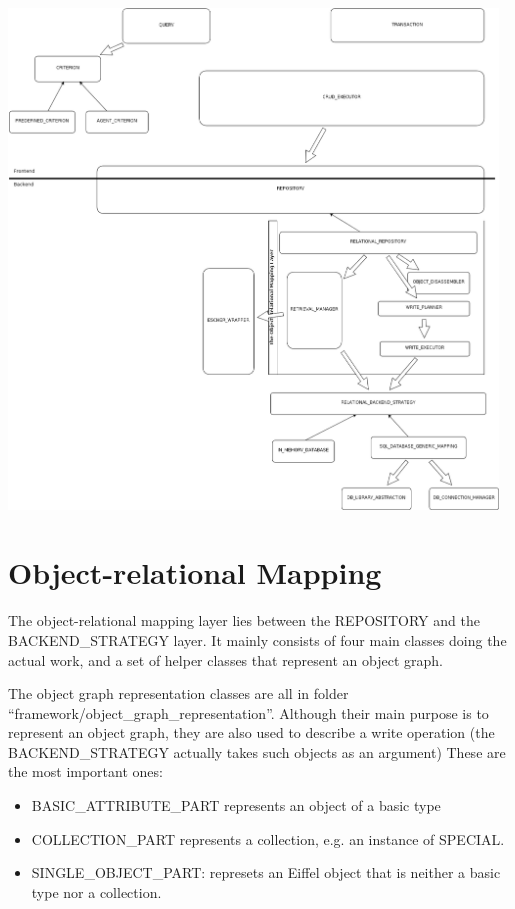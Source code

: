\includegraphics[width = 13cm] {class_diagram.png}

\section{Object-relational Mapping}
\label{section:ORM}

The object-relational mapping layer lies between the REPOSITORY and the BACKEND\_STRATEGY layer.
It mainly consists of four main classes doing the actual work, and a set of helper classes that represent an object graph.

The object graph representation classes are all in folder ``framework/object\_graph\_representation''. 
Although their main purpose is to represent an object graph, they are also used to describe a write operation (the BACKEND\_STRATEGY actually takes such objects as an argument)
These are the most important ones:

\begin{itemize}
 \item BASIC\_ATTRIBUTE\_PART represents an object of a basic type
 \item COLLECTION\_PART represents a collection, e.g. an instance of SPECIAL.
 \item SINGLE\_OBJECT\_PART: represets an Eiffel object that is neither a basic type nor a collection.
\end{itemize}

